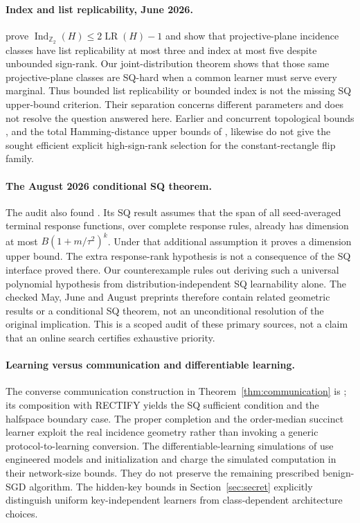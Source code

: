 \paragraph{Index and list replicability, June 2026.}
\citet[Theorems~1.1, 1.2 and 3.2]{BHHLT26} prove $\operatorname{Ind}_{\mathbb Z_2}(H)\le2\operatorname{LR}(H)-1$ and show that projective-plane incidence classes have list replicability at most three and index at most five despite unbounded sign-rank. Our joint-distribution theorem shows that those same projective-plane classes are SQ-hard when a common learner must serve every marginal. Thus bounded list replicability or bounded index is not the missing SQ upper-bound criterion. Their separation concerns different parameters and does not resolve the question answered here. Earlier and concurrent topological bounds \citep{HHM23,FHV26}, and the total Hamming-distance upper bounds of \citet{GHIS25}, likewise do not give the sought efficient explicit high-sign-rank selection for the constant-rectangle flip family.

\paragraph{The August 2026 conditional SQ theorem.}
The audit also found \citet[Assumption~4.42 and Theorem~4.9]{VALG26}. Its SQ result assumes that the span of all seed-averaged terminal response functions, over complete response rules, already has dimension at most $B(1+m/\tau^2)^k$. Under that additional assumption it proves a dimension upper bound. The extra response-rank hypothesis is not a consequence of the SQ interface proved there. Our counterexample rules out deriving such a universal polynomial hypothesis from distribution-independent SQ learnability alone. The checked May, June and August preprints therefore contain related geometric results or a conditional SQ theorem, not an unconditional resolution of the original implication. This is a scoped audit of these primary sources, not a claim that an online search certifies exhaustive priority.

\paragraph{Learning versus communication and differentiable learning.}
The converse communication construction in Theorem~\ref{thm:communication} is \citet[Proposition~3.14]{HHPTZ22}; its composition with RECTIFY yields the SQ sufficient condition and the halfspace boundary case. The proper completion and the order-median succinct learner exploit the real incidence geometry rather than invoking a generic protocol-to-learning conversion. The differentiable-learning simulations of \citet{AKMSS21} use engineered models and initialization and charge the simulated computation in their network-size bounds. They do not preserve the remaining prescribed benign-SGD algorithm. The hidden-key bounds in Section~\ref{sec:secret} explicitly distinguish uniform key-independent learners from class-dependent architecture choices.

